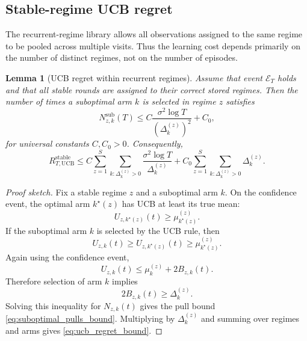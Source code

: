 \documentclass[11pt]{article}
\newtheorem{lemma}{Lemma}
\begin{document}
\subsection{Stable-regime UCB regret}
\label{subsec:stable_ucb_regret}

The recurrent-regime library allows all observations assigned to the same regime to be pooled across multiple visits. Thus the learning cost depends primarily on the number of distinct regimes, not on the number of episodes.

\begin{lemma}[UCB regret within recurrent regimes]
\label{lem:ucb_regret}
Assume that event $\mathcal E_T$ holds and that all stable rounds are assigned to their correct stored regimes. Then the number of times a suboptimal arm $k$ is selected in regime $z$ satisfies
\begin{equation}
\label{eq:suboptimal_pulls_bound}
N_{z,k}^{\mathrm{sub}}(T)
\leq
C
\frac{\sigma^2\log T}{(\Delta_k^{(z)})^2}
+
C_0,
\end{equation}
for universal constants $C,C_0>0$. Consequently,
\begin{equation}
\label{eq:ucb_regret_bound}
R_{T,\mathrm{UCB}}^{\mathrm{stable}}
\leq
C
\sum_{z=1}^{S}
\sum_{k:\Delta_k^{(z)}>0}
\frac{\sigma^2\log T}{\Delta_k^{(z)}}
+
C_0
\sum_{z=1}^{S}
\sum_{k:\Delta_k^{(z)}>0}
\Delta_k^{(z)}.
\end{equation}
\end{lemma}

\begin{proof}[Proof sketch]
Fix a stable regime $z$ and a suboptimal arm $k$. On the confidence event, the optimal arm $k^\star(z)$ has UCB at least its true mean:
\begin{equation}
\label{eq:optimal_ucb_lower}
U_{z,k^\star(z)}(t)
\geq
\mu_{k^\star(z)}^{(z)}.
\end{equation}
If the suboptimal arm $k$ is selected by the UCB rule, then
\begin{equation}
\label{eq:suboptimal_selected_ucb}
U_{z,k}(t)
\geq
U_{z,k^\star(z)}(t)
\geq
\mu_{k^\star(z)}^{(z)}.
\end{equation}
Again using the confidence event,
\begin{equation}
\label{eq:suboptimal_ucb_upper}
U_{z,k}(t)
\leq
\mu_k^{(z)}+2B_{z,k}(t).
\end{equation}
Therefore selection of arm $k$ implies
\begin{equation}
\label{eq:radius_gap_condition}
2B_{z,k}(t)
\geq
\Delta_k^{(z)}.
\end{equation}
Solving this inequality for $N_{z,k}(t)$ gives the pull bound \eqref{eq:suboptimal_pulls_bound}. Multiplying by $\Delta_k^{(z)}$ and summing over regimes and arms gives \eqref{eq:ucb_regret_bound}.
\end{proof}
\end{document}
